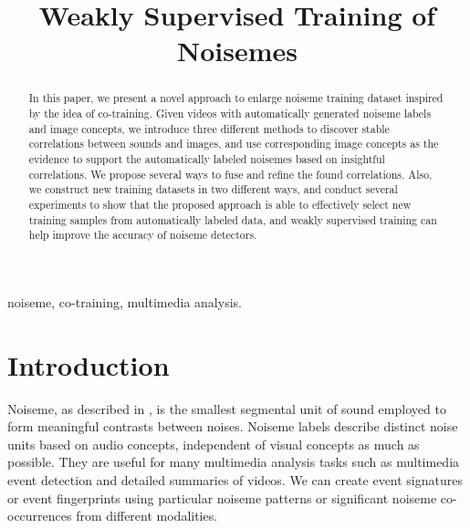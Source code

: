 \documentclass[conference, 11pt, onecolumn]{IEEEtran}
\begin{document}
\title{Weakly Supervised Training of Noisemes}

\author{
\and
{}
}


\maketitle

\begin{abstract}
In this paper, we present a novel approach to enlarge noiseme training dataset inspired by the idea of co-training. Given videos with automatically generated noiseme labels and image concepts, we introduce three different methods to discover stable correlations between sounds and images, and use corresponding image concepts as the evidence to support the automatically labeled noisemes based on insightful correlations. We propose several ways to fuse and refine the found correlations. Also, we construct new training datasets in two different ways, and conduct several experiments to show that the proposed approach is able to effectively select new training samples from automatically labeled data, and weakly supervised training can help improve the accuracy of noiseme detectors.
\end{abstract}

\begin{IEEEkeywords}
noiseme, co-training, multimedia analysis.
\end{IEEEkeywords}

\section{Introduction}
\label{section:introduction}
Noiseme, as described in \cite{burger2012noisemes}, is the smallest segmental unit of sound employed to form meaningful contrasts between noises. Noiseme labels describe distinct noise units based on audio concepts, independent of visual concepts as much as possible. They are useful for many multimedia analysis tasks such as multimedia event detection and detailed summaries of videos. We can create event signatures or event fingerprints using particular noiseme patterns or significant noiseme co-occurrences from different modalities.
\end{document}
